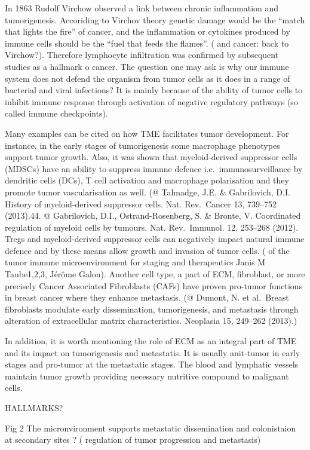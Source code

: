 \documentclass[12pt,]{book}
\theoremstyle{definition}
\theoremstyle{definition}
\theoremstyle{definition}
\theoremstyle{remark}
\begin{document}
In 1863 Rudolf Virchow observed a link between chronic inflammation and
tumorigenesis. Accoriding to Virchov theory genetic damage would be the
``match that lights the fire'' of cancer, and the inflammation or
cytokines produced by immune cells should be the ``fuel that feeds the
flames''. (\citet{Inflammation} and cancer: back to Virchow?). Therefore
lymphocyte infiltration was confirmed by subsequent studies as a
hallmark o cancer. The question one may ask is why our immune system
does not defend the organism from tumor cells as it does in a range of
bacterial and viral infections? It is mainly because of the ability of
tumor cells to inhibit immune response through activation of negative
regulatory pathways (so called immune checkpoints).

Many examples can be cited on how TME facilitates tumor development. For
instance, in the early stages of tumorigenesis some macrophage
phenotypes support tumor growth. Also, it was shown that myeloid-derived
suppressor cells (MDSCs) have an ability to suppress immune defence
i.e.~immunosurveillance by dendritic cells (DCs), T cell activation and
macrophage polarisation and they promote tumor vascularisation as well.
(@ Talmadge, J.E. \& Gabrilovich, D.I. History of myeloid-derived
suppressor cells. Nat. Rev.~Cancer 13, 739--752 (2013).44. @
Gabrilovich, D.I., Ostrand-Rosenberg, S. \& Bronte, V. Coordinated
regulation of myeloid cells by tumours. Nat. Rev.~Immunol. 12, 253--268
(2012). Tregs and myeloid-derived suppressor cells can negatively impact
natural immune defence and by these means allow growth and invasion of
tumor cells. (\citet{Implications} of the tumor immune microenvironment
for staging and therapeutics Janis M Taube1,2,3, Jérôme Galon). Another
cell type, a part of ECM, fibroblast, or more precisely Cancer
Associated Fibroblasts (CAFs) have proven pro-tumor functions in breast
cancer where they enhance metastasis. (@ Dumont, N. et al.~Breast
fibroblasts modulate early dissemination, tumorigenesis, and metastasis
through alteration of extracellular matrix characteristics. Neoplasia
15, 249--262 (2013).)

In addition, it is worth mentioning the role of ECM as an integral part
of TME and its impact on tumorigenesis and metastatis. It is usually
anit-tumor in early stages and pro-tumor at the metastatic stages. The
blood and lymphatic vessels maintain tumor growth providing necessary
nutritive compound to malignant cells.

HALLMARKS?

Fig 2 The micronvironment supports metastatic dissemination and
colonistaion at secondary sites ? (\citet{Microenvironmental} regulation
of tumor progression and metastasis)
\end{document}
